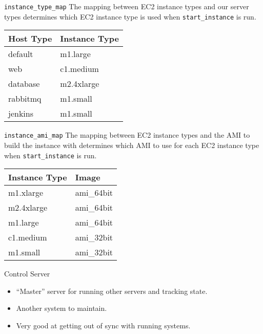 \documentclass{beamer}
\begin{document}
\begin{frame}{\texttt{instance\_type\_map}}
    The mapping between EC2 instance types and our server types
    determines which EC2 instance type is used when
    \texttt{start\_instance} is run.

    \begin{example}
      \begin{center}
        \begin{tabular}[h]{|l|l|}
          \hline
          Host Type & Instance Type \\
          \hline
          default & m1.large \\
          web & c1.medium \\
          database & m2.4xlarge \\
          rabbitmq & m1.small \\
          jenkins & m1.small \\
          \hline
        \end{tabular}
      \end{center}
    \end{example}

\end{frame}

\begin{frame}{\texttt{instance\_ami\_map}}
  The mapping between EC2 instance types and the AMI to build the
  instance with determines which AMI to use for each EC2 instance
  type when \texttt{start\_instance} is run.

    \begin{example}
      \begin{center}
        \begin{tabular}[h]{|l|l|}
          \hline
          Instance Type & Image \\
          \hline
          m1.xlarge & ami\_64bit \\
          m2.4xlarge & ami\_64bit \\
          m1.large & ami\_64bit \\
          c1.medium & ami\_32bit \\
          m1.small & ami\_32bit \\
          \hline
        \end{tabular}
      \end{center}
    \end{example}
\end{frame}

\begin{frame}{Control Server}

  \begin{itemize}
  \item ``Master'' server for running other servers and tracking
    state.
  \item Another system to maintain.
  \item Very good at getting out of sync with running systems.
  \end{itemize}
\end{frame}
\end{document}
